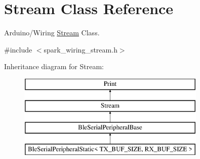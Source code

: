 \hypertarget{class_stream}{}\section{Stream Class Reference}
\label{class_stream}


Arduino/\+Wiring \mbox{\hyperlink{class_stream}{Stream}} Class.  




{\ttfamily \#include $<$spark\+\_\+wiring\+\_\+stream.\+h$>$}

Inheritance diagram for Stream\+:\begin{figure}[H]
\begin{center}
\leavevmode
\includegraphics[height=4.000000cm]{class_stream}
\end{center}
\end{figure}
